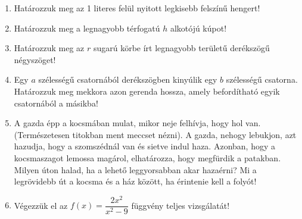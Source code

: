 \documentclass[a4paper, 12pt]{scrartcl}
\begin{document}
\begin{enumerate}
  \item Határozzuk meg az 1 literes felül nyitott legkisebb felszínű hengert!

  \item Határozzuk meg a legnagyobb térfogatú $h$ alkotójú kúpot!

  \item Határozzuk meg az $r$ sugarú körbe írt legnagyobb területű derékszögű
        négyszöget!

  \item Egy $a$ szélességű csatornából derékszögben kinyúlik egy $b$ szélességű
        csatorna. Határozzuk meg mekkora azon gerenda hossza, amely befordítható
        egyik csatornából a másikba!

  \item A gazda épp a kocsmában mulat, mikor neje felhívja, hogy hol van.
        (Természetesen titokban ment meccset nézni). A gazda, nehogy lebukjon,
        azt hazudja, hogy a szomszédnál van és sietve indul haza. Azonban, hogy
        a kocsmaszagot lemossa magárol, elhatározza, hogy megfürdik a patakban.
        Milyen úton halad, ha a lehető leggyorsabban akar hazaérni? Mi a
        legrövidebb út a kocsma és a ház között, ha érintenie kell a folyót!
        \begin{center}
        \end{center}

  \item Végezzük el az $f(x) = \dfrac{2x^2}{x^2 - 9}$ függvény teljes
        vizsgálatát!
\end{enumerate}

\end{document}
